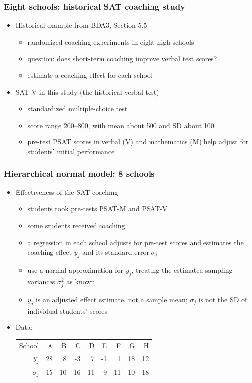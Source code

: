 \documentclass[10pt]{beamer}
\begin{document}
\begin{frame}

\frametitle{Eight schools: historical SAT coaching study}

  \begin{itemize}
  \item Historical example from BDA3, Section 5.5
    \begin{itemize}
    \item randomized coaching experiments in eight high schools
    \item question: does short-term coaching improve verbal test scores?
    \item estimate a coaching effect for each school
    \end{itemize}
    \pause
  \item SAT-V in this study (the historical verbal test)
    \begin{itemize}
    \item standardized multiple-choice test
    \item score range 200--800, with mean about 500 and SD about 100
    \item pre-test PSAT scores in verbal (V) and mathematics (M)
      help adjust for students' initial performance
    \end{itemize}
\end{itemize}
\end{frame}

\begin{frame}

\frametitle{Hierarchical normal model: 8 schools}

  \begin{itemize}
  \item Effectiveness of the SAT coaching
    \begin{itemize}
    \item students took pre-tests PSAT-M and PSAT-V
    \item some students received coaching
    \item a regression in each school adjusts for pre-test scores and
      estimates the coaching effect $y_j$ and its standard error $\sigma_j$
    \item use a normal approximation for $y_j$, treating the estimated
      sampling variances $\sigma_j^2$ as known
    \item $y_j$ is an adjusted effect estimate, not a sample mean;
      $\sigma_j$ is not the SD of individual students' scores
    \end{itemize}
    \pause
  \item Data:
    {\small
    \begin{tabular}[t]{r | r r r r r r r r}
      School & A & B & C & D & E & F & G & H \\
      $y_j$ & 28 & 8 & -3 & 7 & -1 & 1 & 18 & 12 \\
      $\sigma_j$ & 15 & 10 & 16 & 11 & 9 & 11 & 10 & 18
    \end{tabular}}
  \end{itemize}
\end{frame}
\end{document}
